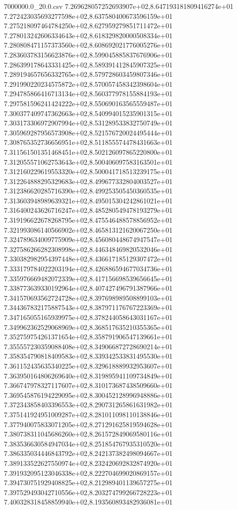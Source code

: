 \begin{filecontents*}{7000000.0_20.0.csv}
7.269628057252693907e+02,8.647193181809416274e+01
7.272423035693277598e+02,8.637580400673596159e+01
7.275218097464784250e+02,8.627959279851711472e+01
7.278013242606334643e+02,8.618329820000508334e+01
7.280808471157373560e+02,8.608692021776005276e+01
7.283603783156623876e+02,8.599045885837676906e+01
7.286399178643331425e+02,8.589391412845907325e+01
7.289194657656332765e+02,8.579728603459807346e+01
7.291990220234575872e+02,8.570057458342398604e+01
7.294785866416713134e+02,8.560377978155884193e+01
7.297581596241424222e+02,8.550690163565559487e+01
7.300377409747362663e+02,8.540994015235901315e+01
7.303173306972907994e+02,8.531289533832750749e+01
7.305969287956573908e+02,8.521576720024495444e+01
7.308765352736656951e+02,8.511855574478431663e+01
7.311561501351468451e+02,8.502126097865220800e+01
7.312055571062753643e+02,8.500406097583163501e+01
7.312160229619553320e+02,8.500041718513239175e+01
7.312264888295329683e+02,8.499677332804003527e+01
7.312386620285716390e+02,8.499253505450360535e+01
7.313603948989639321e+02,8.495015304242861021e+01
7.316400243626716247e+02,8.485280549478193279e+01
7.319196622678268795e+02,8.475546488578856952e+01
7.321993086140566902e+02,8.465813121620067250e+01
7.324789634009775909e+02,8.456080448674947547e+01
7.327586266282308998e+02,8.446348469820532046e+01
7.330382982954397448e+02,8.436617185129307472e+01
7.333179784022203194e+02,8.426886594677034736e+01
7.335976669482072339e+02,8.417156698539656645e+01
7.338773639330192964e+02,8.407427496791387966e+01
7.341570693562724728e+02,8.397698989508899103e+01
7.344367832175887543e+02,8.387971176767223369e+01
7.347165055165939975e+02,8.378244058643031167e+01
7.349962362529068969e+02,8.368517635210355365e+01
7.352759754261371654e+02,8.358791906547139661e+01
7.355557230359088408e+02,8.349066872728690214e+01
7.358354790818409583e+02,8.339342533831495530e+01
7.361152435635340225e+02,8.329618889932953607e+01
7.363950164806269640e+02,8.319895941109734849e+01
7.366747978327117607e+02,8.310173687438509660e+01
7.369545876194229095e+02,8.300452128996948886e+01
7.372343858403396553e+02,8.290731265861631982e+01
7.375141924951009287e+02,8.281011098110138846e+01
7.377940075833071205e+02,8.271291625819594628e+01
7.380738311045686260e+02,8.261572849069580116e+01
7.383536630584947034e+02,8.251854767935310520e+01
7.386335034446843792e+02,8.242137382498094667e+01
7.389133522627550974e+02,8.232420692832874920e+01
7.391932095123046338e+02,8.222704699020869157e+01
7.394730751929408825e+02,8.212989401139657275e+01
7.397529493042710556e+02,8.203274799266728223e+01
7.400328318458859940e+02,8.193560893482936081e+01

\end{filecontents*}
